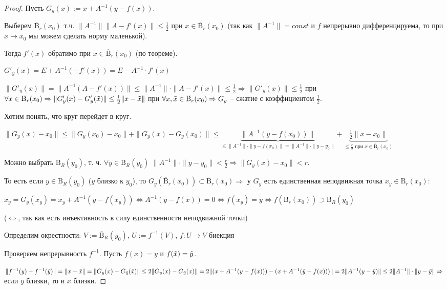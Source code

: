 \begin{proof} 
    Пусть $G_y(x):=x+A^{-1}(y-f(x))$. 
    
    Выберем $\overline{\text{B}}_r(x_0)$ т.ч. $ \|A^{-1}\|\|A-f'(x)\|\leq \frac{1}{2}$ при $x\in \overline{\text{B}}_r(x_0)$ (так как $\|A^{-1}\|=const$ и $f$ непрерывно дифференцируема, то при $x\rightarrow x_0$ мы можем сделать норму маленькой). 
    
    Тогда $f'(x)$ обратимо при $x\in \overline{\text{B}}_r(x_0)$ (по теореме).

    $G'_y(x)=E+A^{-1}(-f'(x))=E-A^{-1}\cdot f'(x)$

    $\|G'_y(x)\|=\|A^{-1}(A-f'(x))\|\leq \|A^{-1}\|\cdot  \|A-f'(x)\|\leq \frac{1}{2}\Rightarrow\|G'_y(x)\|\leq \frac{1}{2}$ при $\forall x\in \overline{\text{B}}_r(x_0)\Rightarrow \|G'_y(x)-G'_y(\Tilde{x})\|\leq \frac{1}{2}\|x-\Tilde{x}\|$ при $\forall x, \Tilde{x}\in \overline{\text{B}}_r(x_0)\Rightarrow G_y$ – сжатие с коэффициентом $\frac{1}{2}$.

    Хотим понять, что круг перейдет в круг.

    $\|G_y(x)-x_0\|\leq \|G_y(x_0)-x_0\|+\|G_y(x)-G_y(x_0)\|\leq \underbrace{\|A^{-1}(y-f(x_0))\|}_{\leq \|A^{-1}\|\cdot \|y-f(x_0)\|=\|A^{-1}\|\cdot \|y-y_0\|}+\underbrace{\frac{1}{2}\|x-x_0\|}_{\leq \frac{r}{2}\text{ при }x\in \overline{\text{B}}_r(x_0)}$

    Можно выбрать $\text{B}_R(y_0)$, т. ч. $\forall y\in \text{B}_R(y_0)$ $\|A^{-1}\|\cdot \|y-y_0\|< \frac{r}{2}\Rightarrow \|G_y(x)-x_0\|<r$.

    То есть если $y\in\text{B}_R(y_0)$ ($y$ близко к $y_0$), то $G_y(\overline{\text{B}}_r(x_0))\subset  \text{B}_r(x_0)\Rightarrow$ у $G_y$  есть единственная неподвижная точка $x_y\in \text{B}_r(x_0)$:

    $x_y=G_y(x_y)=x_y+A^{-1}(y-f(x_y))\Leftrightarrow A^{-1}(y-f(x))=0\Leftrightarrow f(x_y)=y\Leftrightarrow f(\overline{\text{B}}_r(x_0))\supset \overline{\text{B}}_R(y_0)$

    ($\Leftrightarrow$, так как есть инъективность в силу единственности неподвижной точки)

    Определим окрестности: $V:=\overline{\text{B}}_R(y_0)$, $U:=f^{-1}(V)$, $f:U\rightarrow V$ биекция

    Проверяем непрерывность $f^{-1}$. Пусть $f(x)=y$ и $f(\Tilde{x})=\Tilde{y}$.

    $\|f^{-1}(y)-f^{-1}(\Tilde{y})\|=\|x-\Tilde{x}\|=\|G_y(x)-G_{\Tilde{y}}(\Tilde{x})\|\leq 2 \|G_y(x)-G_{\Tilde{y}}(x)\|=2\|(x+A^{-1}(y-f(x)))-(x+A^{-1}(\Tilde{y}-f(x)))\|=2\|A^{-1}(y-\tilde{y})\|\leq 2\|A^{-1}\|\cdot \|y-\Tilde{y}\|\Rightarrow$ если $y$ близки, то и $x$ близки.
\end{proof}

